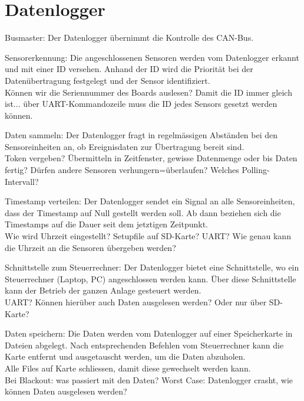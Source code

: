 \section{Datenlogger}
\begin{description}
\item{Busmaster}: Der Datenlogger übernimmt die Kontrolle des CAN-Bus. 

\item{Sensorerkennung}: Die angeschlossenen Sensoren werden vom Datenlogger erkannt und mit einer ID versehen. Anhand der ID wird die Priorität bei der Datenübertragung festgelegt und der Sensor identifiziert.\\
Können wir die Seriennummer des Boards auslesen? Damit die ID immer gleich ist... über UART-Kommandozeile muss die ID jedes Sensors gesetzt werden können.



\item{Daten sammeln}: Der Datenlogger fragt in regelmässigen Abständen bei den Sensoreinheiten an, ob Ereignisdaten zur Übertragung bereit sind.\\
Token vergeben? Übermitteln in Zeitfenster, gewisse Datenmenge oder bis Daten fertig? Dürfen andere Sensoren verhungern=überlaufen? Welches Polling-Intervall?

\item{Timestamp verteilen}: Der Datenlogger sendet ein Signal an alle Sensoreinheiten, dass der Timestamp auf Null gestellt werden soll. Ab dann beziehen sich die Timestamps auf die Dauer seit dem jetztigen Zeitpunkt.\\
Wie wird Uhrzeit eingestellt? Setupfile auf SD-Karte? UART? Wie genau kann die Uhrzeit an die Sensoren übergeben werden?

\item{Schnittstelle zum Steuerrechner}: Der Datenlogger bietet eine Schnittstelle, wo ein Steuerrechner (Laptop, PC) angeschlossen werden kann. Über diese Schnittstelle kann der Betrieb der ganzen Anlage gesteuert werden.\\
 UART? Können hierüber auch Daten ausgelesen werden? Oder nur über SD-Karte?

\item{Daten speichern}: Die Daten werden vom Datenlogger auf einer Speicherkarte in Dateien abgelegt. Nach entsprechenden Befehlen vom Steuerrechner kann die Karte entfernt und ausgetauscht werden, um die Daten abzuholen.\\
Alle Files auf Karte schliessen, damit diese gewechselt werden kann.\\
Bei Blackout: was passiert mit den Daten? Worst Case: Datenlogger crasht, wie können Daten ausgelesen werden?


\end{description}
